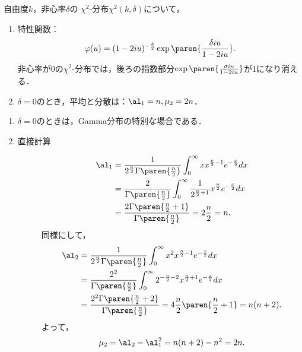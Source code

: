 \documentclass[uplatex,dvipdfmx]{jsreport}
\begin{document}
\begin{proposition}[特性値]
    自由度$k$，非心率$\delta$の
    $\chi^2$-分布$\chi^2(k,\delta)$について，
    \begin{enumerate}
        \item 特性関数：
        \[\varphi(u)=(1-2iu)^{-\frac{k}{2}}\exp\paren{\frac{\delta iu}{1-2iu}}.\]
        非心率が$0$の$\chi^2$-分布では，後ろの指数部分$\exp\paren{\frac{\sigma iu}{1-2iu}}$が1になり消える．
        \item $\delta=0$のとき，平均と分散は：$\al_1=n,\mu_2=2n$．
    \end{enumerate}
\end{proposition}
\begin{Proof}\mbox{}
    \begin{enumerate}
        \item $\delta=0$のときは，Gamma分布の特別な場合である．
        \item \begin{description}
            \item[直接計算] \begin{align*}
                \al_1&=\frac{1}{2^{\frac{n}{2}}\Gamma\paren{\frac{n}{2}}}\int^\infty_0xx^{\frac{n}{2}-1}e^{-\frac{x}{2}}dx\\
                &=\frac{2}{\Gamma\paren{\frac{n}{2}}}\int^\infty_0\frac{1}{2^{\frac{n}{2}+1}}x^{\frac{n}{2}}e^{-\frac{x}{2}}dx\\
                &=\frac{2\Gamma\paren{\frac{n}{2}+1}}{\Gamma\paren{\frac{n}{2}}}=2\frac{n}{2}=n.
            \end{align*}
            同様にして，
            \begin{align*}
                \al_2&=\frac{1}{2^{\frac{n}{2}}\Gamma\paren{\frac{n}{2}}}\int^\infty_0x^2x^{\frac{n}{2}-1}e^{-\frac{x}{2}}dx\\
                &=\frac{2^2}{\Gamma\paren{\frac{n}{2}}}\int^\infty_02^{-\frac{n}{2}-2}x^{\frac{n}{2}+1}e^{-\frac{x}{2}}dx\\
                &=\frac{2^2\Gamma\paren{\frac{n}{2}+2}}{\Gamma\paren{\frac{n}{2}}}=4\frac{n}{2}\paren{\frac{n}{2}+1}=n(n+2).
            \end{align*}
            よって，
            \[\mu_2=\al_2-\al_1^2=n(n+2)-n^2=2n.\]
        \end{description}
    \end{enumerate}
\end{Proof}
\end{document}
